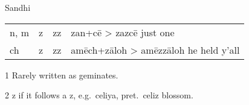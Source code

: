 \documentclass[12pt]{beamer}
\newcommand{\nah}[1]{\textcolor{nahgrn}{#1}}
\newcommand{\trs}[1]{\textcolor{nahblu}{#1}}
\begin{document}
\begin{frame}
\begin{columns}[t]
\begin{column}{.26\linewidth}
\begin{block}{Sandhi}
\begin{threeparttable}
\begin{tabular}{l@{+ }l@{> }ll}
            \nah{n, m} & \nah{z}   & \nah{zz}\tnote{1}     & \nah{zan}+\nah{cē} > \nah{zazcē} \trs{just one}                 \\
            \nah{ch}   & \nah{z}   & \nah{zz}\tnote{1}     & \nah{amēch}+\nah{zāloh} > \nah{amēzzāloh} \trs{he held y'all}   \\
          \end{tabular}%
          \begin{tablenotes}
            \item[1] Rarely written as geminates.
            \item[2] \nah{z} if it follows a \nah{z}, e.g.~\nah{celiya}, pret.~\nah{celiz} \trs{blossom}.

          \end{tablenotes}
        \end{threeparttable}
      \end{block}


\end{column}
\end{columns}
\end{frame}
\end{document}
